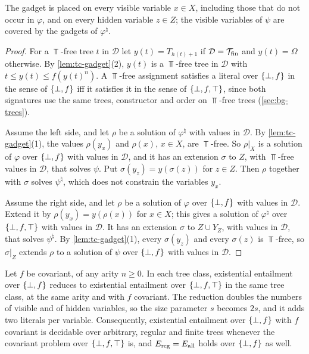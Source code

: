 The gadget is placed on every visible variable $x\in X$, including those that
do not occur in $\varphi$, and on every hidden variable $z\in Z$; the visible
variables of $\psi$ are covered by the gadgets of $\varphi^\natural$.

\begin{proof}
For a $\Top$-free tree $t$ in $\mathcal D$ let $y(t)=T_{h(t)+1}$ if
$\mathcal D=\mathcal{T}_{\mathrm{fin}}$ and $y(t)=\Omega$ otherwise. By
\cref{lem:tc-gadget}(2), $y(t)$ is a $\Top$-free tree in $\mathcal D$ with
$t\le y(t)\le f(y(t)^n)$. A $\Top$-free assignment satisfies a literal over
$\{\bot,f\}$ in the sense of $\{\bot,f\}$ iff it satisfies it in the sense of $\{\bot,f,\top\}$, since
both signatures use the same trees, constructor and order on $\Top$-free
trees (\cref{sec:bg-trees}).

Assume the left side, and let $\rho$ be a solution of $\varphi^\natural$ with
values in $\mathcal D$. By \cref{lem:tc-gadget}(1), the values $\rho(y_x)$ and
$\rho(x)$, $x\in X$, are $\Top$-free. So $\rho|_X$ is a solution of $\varphi$
over $\{\bot,f\}$ with values in $\mathcal D$, and it has an extension $\sigma$ to
$Z$, with $\Top$-free values in $\mathcal D$, that solves $\psi$. Put
$\sigma(y_z)=y(\sigma(z))$ for $z\in Z$. Then $\rho$ together with $\sigma$
solves $\psi^\natural$, which does not constrain the variables $y_x$.

Assume the right side, and let $\rho$ be a solution of $\varphi$ over $\{\bot,f\}$
with values in $\mathcal D$. Extend it by $\rho(y_x)=y(\rho(x))$ for $x\in X$;
this gives a solution of $\varphi^\natural$ over $\{\bot,f,\top\}$ with values in
$\mathcal D$. It has an extension $\sigma$ to $Z\cup Y_Z$, with values in
$\mathcal D$, that solves $\psi^\natural$. By \cref{lem:tc-gadget}(1), every
$\sigma(y_z)$ and every $\sigma(z)$ is $\Top$-free, so $\sigma|_Z$ extends
$\rho$ to a solution of $\psi$ over $\{\bot,f\}$ with values in $\mathcal D$.
\end{proof}

\begin{corollary}\label{cor:tc-bf}
Let $f$ be covariant, of any arity $n\ge0$. In each tree class, existential
entailment over $\{\bot,f\}$ reduces to existential entailment over $\{\bot,f,\top\}$ in the same
tree class, at the same arity and with $f$ covariant. The reduction doubles the
numbers of visible and of hidden variables, so the size parameter $s$ becomes
$2s$, and it adds two literals per variable. Consequently, existential
entailment over $\{\bot,f\}$ with $f$ covariant is decidable over arbitrary, regular
and finite trees whenever the covariant problem over $\{\bot,f,\top\}$ is, and
$E_{\mathrm{reg}}=E_{\mathrm{all}}$ holds over $\{\bot,f\}$ as well.
\end{corollary}

